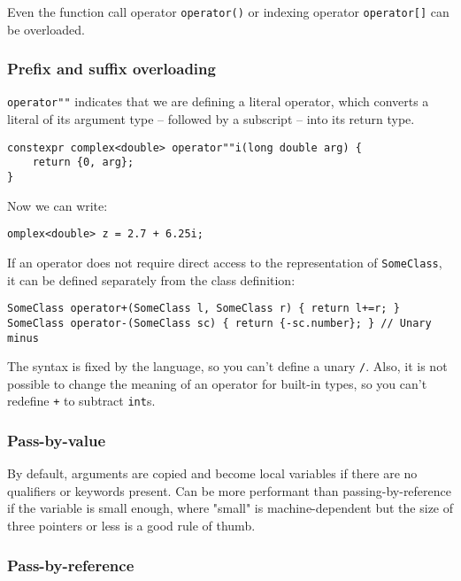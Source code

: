 \documentclass[8pt, table, xcdraw]{article}%
\begin{document}
Even the function call operator \lstinline{operator()} or indexing operator \lstinline{operator[]} can be overloaded.

\subsubsection{Prefix and suffix overloading}

\lstinline{operator""} indicates that we are defining a literal operator, which converts a literal of its argument type -- followed by a subscript -- into its return type.

\begin{lstlisting}
constexpr complex<double> operator""i(long double arg) {
    return {0, arg};
}
\end{lstlisting}

Now we can write:

\begin{lstlisting}
omplex<double> z = 2.7 + 6.25i;
\end{lstlisting}

If an operator does not require direct access to the representation of \lstinline{SomeClass}, it can be defined separately from the class definition:

\begin{lstlisting}
SomeClass operator+(SomeClass l, SomeClass r) { return l+=r; }
SomeClass operator-(SomeClass sc) { return {-sc.number}; } // Unary minus
\end{lstlisting}

The syntax is fixed by the language, so you can’t define a unary \lstinline{/}.  Also, it is not possible to change the meaning of an operator for built-in types, so you can’t redefine \lstinline{+} to subtract \lstinline{int}s.

\subsubsection{Pass-by-value}
By default, arguments are copied and become local variables if there are no qualifiers or keywords present. Can be more performant than passing-by-reference if the variable is small enough, where "small" is machine-dependent but the size of three pointers or less is a good rule of thumb.

\subsubsection{Pass-by-reference}
\end{document}
